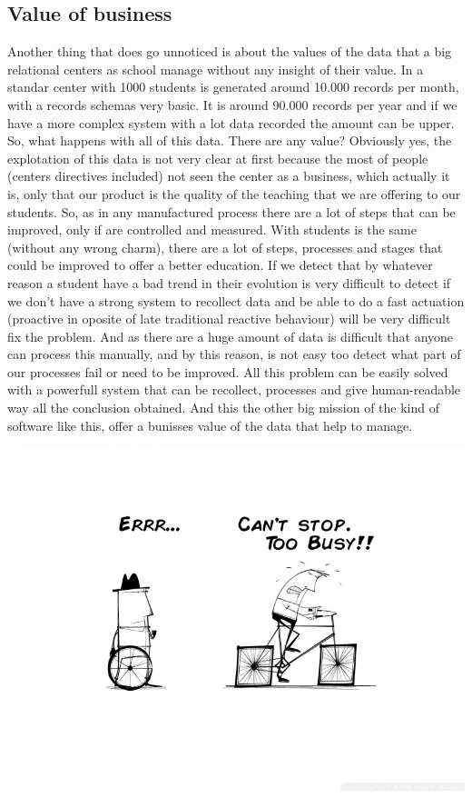 \subsection{Value of business}
Another thing that does go unnoticed is about the values of the data that a big
relational centers as school manage without any insight of their value.
In a standar center with 1000 students is generated around 10.000 records per
month, with a records schemas very basic. It is around 90.000 records per year
and if we have a more complex system with a lot data recorded the amount can be upper.
So, what happens with all of this data. There are any value? Obviously yes,
the explotation of this data is not very clear at first because the most of
people (centers directives included) not seen the center as a business, which
actually it is, only that our product is the quality of the teaching that we are
offering to our students.
So, as in any manufactured process there are a lot of steps that can be improved,
only if are controlled and measured. With students is the same (without any wrong
charm), there are a lot of steps, processes and stages that could be improved to
offer a better education.
If we detect that by whatever reason a student have a bad trend in their evolution
is very difficult to detect if we don't have a strong system to recollect data
and be able to do a fast actuation (proactive in oposite of late traditional
reactive behaviour) will be very difficult fix the problem.
And as there are a huge amount of data is difficult that anyone can process this
manually, and by this reason, is not easy too detect what part of our processes
fail or need to be improved.
All this problem can be easily solved with a powerfull system that can be recollect,
processes and give human-readable way all the conclusion obtained.
And this the other big mission of the kind of software like this, offer a
bunisses value of the data that help to manage.

\includegraphics[scale=0.5]{img/toobusytoimprove.jpeg}


